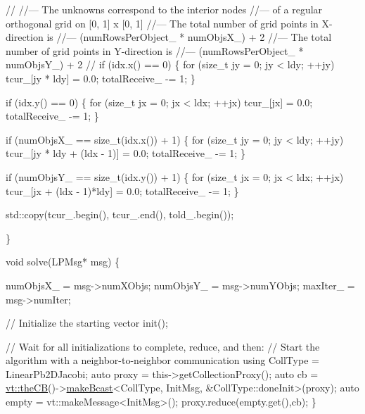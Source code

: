 \begin{DoxyCodeInclude}
    \textcolor{comment}{//}
    \textcolor{comment}{//--- The unknowns correspond to the interior nodes}
    \textcolor{comment}{//--- of a regular orthogonal grid on [0, 1] x [0, 1]}
    \textcolor{comment}{//--- The total number of grid points in X-direction is}
    \textcolor{comment}{//--- (numRowsPerObject\_ * numObjsX\_) + 2}
    \textcolor{comment}{//--- The total number of grid points in Y-direction is}
    \textcolor{comment}{//--- (numRowsPerObject\_ * numObjsY\_) + 2}
    \textcolor{comment}{//}
    \textcolor{keywordflow}{if} (idx.x() == 0) \{
      \textcolor{keywordflow}{for} (\textcolor{keywordtype}{size\_t} jy = 0; jy < ldy; ++jy)
        tcur\_[jy * ldy] = 0.0;
      totalReceive\_ -= 1;
    \}

    \textcolor{keywordflow}{if} (idx.y() == 0) \{
      \textcolor{keywordflow}{for} (\textcolor{keywordtype}{size\_t} jx = 0; jx < ldx; ++jx)
        tcur\_[jx] = 0.0;
      totalReceive\_ -= 1;
    \}

    \textcolor{keywordflow}{if} (numObjsX\_ == \textcolor{keywordtype}{size\_t}(idx.x()) + 1) \{
      \textcolor{keywordflow}{for} (\textcolor{keywordtype}{size\_t} jy = 0; jy < ldy; ++jy)
        tcur\_[jy * ldy + (ldx - 1)] = 0.0;
      totalReceive\_ -= 1;
    \}

    \textcolor{keywordflow}{if} (numObjsY\_ == \textcolor{keywordtype}{size\_t}(idx.y()) + 1) \{
      \textcolor{keywordflow}{for} (\textcolor{keywordtype}{size\_t} jx = 0; jx < ldx; ++jx)
        tcur\_[jx + (ldx - 1)*ldy] = 0.0;
      totalReceive\_ -= 1;
    \}

    std::copy(tcur\_.begin(), tcur\_.end(), told\_.begin());

  \}


  \textcolor{keywordtype}{void} solve(LPMsg* msg) \{

    numObjsX\_ = msg->numXObjs;
    numObjsY\_ = msg->numYObjs;
    maxIter\_ = msg->numIter;

    \textcolor{comment}{// Initialize the starting vector}
    init();

    \textcolor{comment}{// Wait for all initializations to complete, reduce, and then:}
    \textcolor{comment}{// Start the algorithm with a neighbor-to-neighbor communication}
    \textcolor{keyword}{using} CollType = LinearPb2DJacobi;
    \textcolor{keyword}{auto} proxy = this->getCollectionProxy();
    \textcolor{keyword}{auto} cb = \hyperlink{namespacevt_a673b109e94c7bca58313504c83e1da94}{vt::theCB}()->\hyperlink{structvt_1_1pipe_1_1_pipe_manager_a2ea6bd5ea3e001662681b1e5a1971e9d}{makeBcast}<CollType, InitMsg, &CollType::doneInit>(proxy);
    \textcolor{keyword}{auto} empty = vt::makeMessage<InitMsg>();
    proxy.reduce(empty.get(),cb);
  \}


\end{DoxyCodeInclude}
